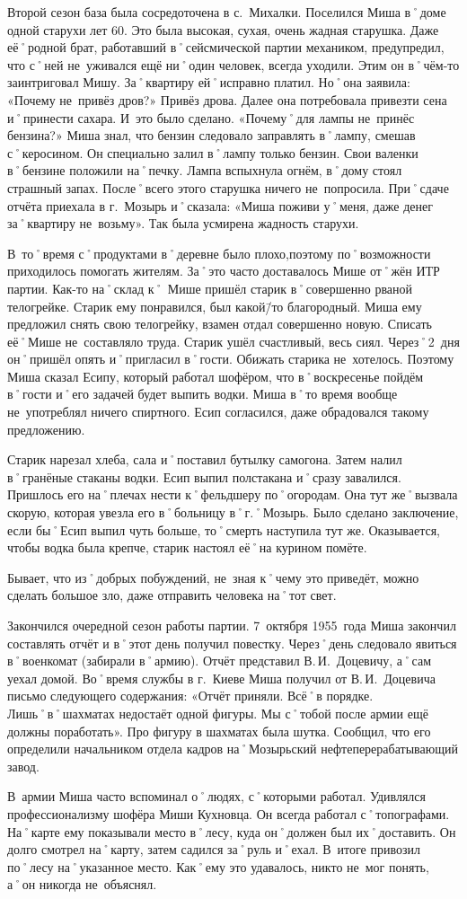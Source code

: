 Второй сезон база была сосредоточена в с.~Михалки. Поселился Миша в˚доме одной старухи лет 60. Это была высокая, сухая, очень жадная старушка. Даже её˚родной брат, работавший в˚сейсмической партии механиком, предупредил, что с˚ней не~уживался ещё ни˚один человек, всегда уходили. Этим он в˚чём-то заинтриговал Мишу. За˚квартиру ей˚исправно платил. Но˚она заявила: «Почему не~привёз  дров?» Привёз дрова. Далее она потребовала привезти сена и˚принести сахара. И~это было сделано. «Почему˚для лампы не~принёс бензина?» Миша знал, что бензин следовало заправлять в˚лампу, смешав с˚керосином. Он специально залил в˚лампу только бензин. Свои валенки в˚бензине положили на˚печку. Лампа вспыхнула огнём, в˚дому стоял страшный запах. После˚всего этого старушка ничего не~попросила. При˚сдаче отчёта приехала в г.~Мозырь и˚сказала: «Миша поживи у˚меня, даже денег за˚квартиру не~возьму». Так была усмирена жадность старухи.

В~то˚время с˚продуктами в˚деревне было плохо,поэтому по˚возможности приходилось помогать жителям. За˚это часто доставалось Мише от˚жён ИТР партии. Как-то на˚склад к˚ Мише пришёл старик в˚совершенно рваной телогрейке. Старик ему понравился, был какой\=/то благородный. Миша ему предложил снять свою телогрейку, взамен отдал совершенно новую. Списать её˚Мише не~составляло труда. Старик ушёл счастливый, весь сиял. Через˚2~дня он˚пришёл опять и˚пригласил в˚гости. Обижать старика не~хотелось. Поэтому Миша сказал Есипу, который работал шофёром, что в˚воскресенье пойдём в˚гости и˚его задачей будет выпить водки. Миша в˚то время вообще не~употреблял ничего спиртного. Есип согласился, даже обрадовался такому предложению. 

Старик нарезал хлеба, сала и˚поставил бутылку самогона. Затем налил в˚гранёные стаканы водки. Есип выпил полстакана и˚сразу завалился. Пришлось его на˚плечах нести к˚фельдшеру по˚огородам. Она тут же˚вызвала скорую, которая увезла его в˚больницу в˚г.˚Мозырь. Было сделано заключение, если бы˚Есип выпил чуть больше, то˚смерть наступила тут же. Оказывается, чтобы водка была крепче, старик настоял её˚на курином помёте.

Бывает, что из˚добрых побуждений, не~зная к˚чему это приведёт, можно сделать большое зло, даже отправить человека на˚тот свет. 

Закончился очередной сезон работы партии. 7~октября 1955~года Миша закончил составлять отчёт и в˚этот день получил повестку. Через˚день следовало явиться в˚военкомат (забирали в˚армию). Отчёт представил В.\,И.~Доцевичу, а˚сам уехал домой. Во˚время службы в г.~Киеве Миша получил от В.\,И.~Доцевича письмо следующего содержания: «Отчёт приняли. Всё˚в порядке. Лишь˚в˚шахматах недостаёт одной фигуры. Мы с˚тобой после армии ещё должны поработать». Про фигуру в шахматах была шутка. Сообщил, что его определили начальником отдела кадров на˚Мозырьский нефтеперерабатывающий завод.

В~армии Миша часто вспоминал о˚людях, с˚которыми работал. Удивлялся профессионализму шофёра Миши Кухновца. Он всегда работал с˚топографами. На˚карте ему показывали место в˚лесу, куда он˚должен был их˚доставить. Он долго смотрел на˚карту, затем садился за˚руль и˚ехал. В~итоге привозил по˚лесу на˚указанное место. Как˚ему это удавалось, никто не~мог понять, а˚он никогда не~объяснял.